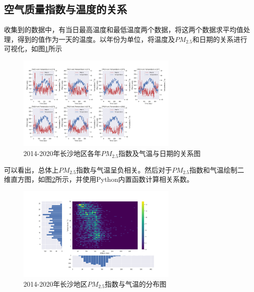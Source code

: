 \documentclass[UTF8,a4paper,10pt]{article}
\begin{document}
\subsection{空气质量指数与温度的关系}
\indent 收集到的数据中，有当日最高温度和最低温度两个数据，将这两个数据求平均值处理，得到的值作为一天的温度。以年份为单位，将温度及$PM_{2.5}$和日期的关系进行可视化，如图\ref{Fig.main1}所示

\begin{figure}[H] %
\centering %
\includegraphics[width=0.7\textwidth]{..//fig//pm25-temp-alltime.png} %
\caption{2014-2020年长沙地区各年$PM_{2.5}$指数及气温与日期的关系图} %
\label{Fig.main1} %
\end{figure}

\indent 可以看出，总体上$PM_{2.5}$指数与气温呈负相关。然后对于$PM_{2.5}$指数和气温绘制二维直方图，如图\ref{Fig.main2}所示，并使用Python内置函数计算相关系数。

\begin{figure}[H] %
\centering %
\includegraphics[width=0.7\textwidth]{..//fig//pm25-temp.png} %
\caption{2014-2020年长沙地区$PM_{2.5}$指数与气温的分布图} %
\label{Fig.main2} %
\end{figure}
\end{document}
